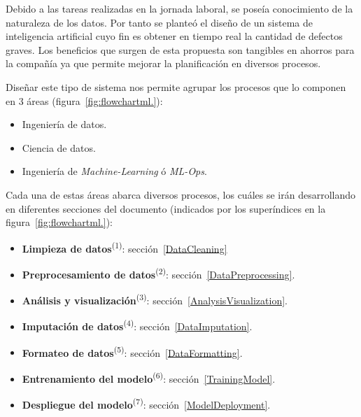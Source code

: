 \documentclass[a4paper,12pt]{article}
\begin{document}
Debido a las tareas realizadas en la jornada laboral, se poseía conocimiento de la naturaleza de los datos. Por tanto se planteó el diseño de un sistema de inteligencia artificial cuyo fin es obtener en tiempo real la cantidad de defectos graves. Los beneficios que surgen de esta propuesta son tangibles en ahorros para la compañía ya que permite mejorar la planificación en diversos procesos.

Diseñar este tipo de sistema nos permite agrupar los procesos que lo componen en 3 áreas (figura~\ref{fig:flowchartml.}):
\begin{itemize}[noitemsep, topsep=2pt]
	\item Ingeniería de datos.
	\item Ciencia de datos.
	\item Ingeniería de \textit{Machine-Learning} ó \textit{ML-Ops}.
\end{itemize}

Cada una de estas áreas abarca diversos procesos, los cuáles se irán desarrollando en diferentes secciones del documento (indicados por los superíndices en la figura~\ref{fig:flowchartml.}):
\begin{itemize}
	\item \textbf{Limpieza de datos}\textsuperscript{(1)}: sección~\ref{DataCleaning}
	\item \textbf{Preprocesamiento de datos}\textsuperscript{(2)}: sección~\ref{DataPreprocessing}.
	\item \textbf{Análisis y visualización}\textsuperscript{(3)}: sección~\ref{AnalysisVisualization}.
	\item \textbf{Imputación de datos}\textsuperscript{(4)}: sección~\ref{DataImputation}.
	\item \textbf{Formateo de datos}\textsuperscript{(5)}: sección~\ref{DataFormatting}.
	\item \textbf{Entrenamiento del modelo}\textsuperscript{(6)}: sección~\ref{TrainingModel}.
	\item \textbf{Despliegue del modelo}\textsuperscript{(7)}: sección~\ref{ModelDeployment}.
\end{itemize}
\end{document}
